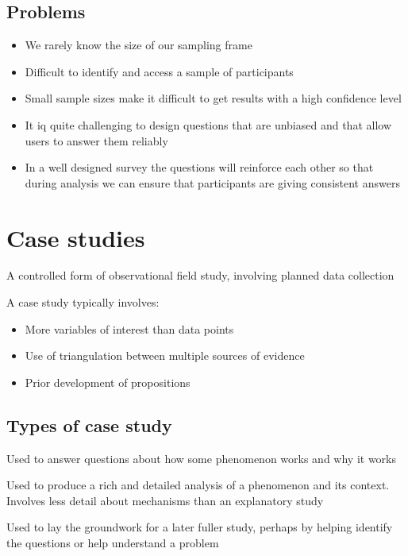 \documentclass{article}[18pt]
\begin{document}
\subsection{Problems}
\begin{itemize}
	\item We rarely know the size of our sampling frame
	\item Difficult to identify and access a sample of participants
	\item Small sample sizes make it difficult to get results with a high confidence level
	\item It iq quite challenging to design questions that are unbiased and that allow users to answer them reliably
	\item In a well designed survey the questions will reinforce each other so that during analysis we can ensure that participants are giving consistent answers
\end{itemize}
\section{Case studies}
\begin{definition}
A controlled form of observational field study, involving planned data collection
\end{definition}
A case study typically involves:
\begin{itemize}
	\item More variables of interest than data points
	\item Use of triangulation between multiple sources of evidence
	\item Prior development of propositions
\end{itemize}
\subsection{Types of case study}
\begin{definition}
Used to answer questions about how some phenomenon works and why it works
\end{definition}
\begin{definition}
Used to produce a rich and detailed analysis of a phenomenon and its context. Involves less detail about mechanisms than an explanatory study
\end{definition}
\begin{definition}
Used to lay the groundwork for a later fuller study, perhaps by helping identify the questions or help understand a problem
\end{definition}
\end{document}
